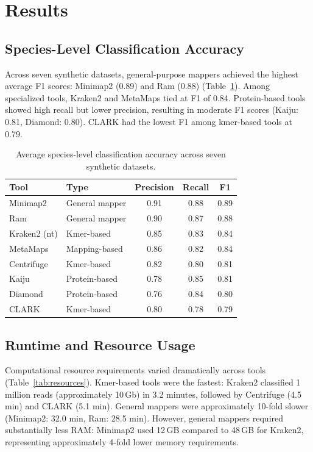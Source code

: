\documentclass[11pt]{article}
\begin{document}
\section{Results}

\subsection{Species-Level Classification Accuracy}

Across seven synthetic datasets, general-purpose mappers achieved the highest average F1 scores: Minimap2 (0.89) and Ram (0.88) (Table~\ref{tab:accuracy}). Among specialized tools, Kraken2 and MetaMaps tied at F1 of 0.84. Protein-based tools showed high recall but lower precision, resulting in moderate F1 scores (Kaiju: 0.81, Diamond: 0.80). CLARK had the lowest F1 among kmer-based tools at 0.79.

\begin{table}[ht]
\centering
\caption{Average species-level classification accuracy across seven synthetic datasets.}
\label{tab:accuracy}
\begin{tabular}{@{}llccc@{}}
\toprule
Tool & Type & Precision & Recall & F1 \\
\midrule
Minimap2 & General mapper & 0.91 & 0.88 & 0.89 \\
Ram & General mapper & 0.90 & 0.87 & 0.88 \\
Kraken2 (nt) & Kmer-based & 0.85 & 0.83 & 0.84 \\
MetaMaps & Mapping-based & 0.86 & 0.82 & 0.84 \\
Centrifuge & Kmer-based & 0.82 & 0.80 & 0.81 \\
Kaiju & Protein-based & 0.78 & 0.85 & 0.81 \\
Diamond & Protein-based & 0.76 & 0.84 & 0.80 \\
CLARK & Kmer-based & 0.80 & 0.78 & 0.79 \\
\bottomrule
\end{tabular}
\end{table}

\subsection{Runtime and Resource Usage}

Computational resource requirements varied dramatically across tools (Table~\ref{tab:resources}). Kmer-based tools were the fastest: Kraken2 classified 1 million reads (approximately 10\,Gb) in 3.2 minutes, followed by Centrifuge (4.5 min) and CLARK (5.1 min). General mappers were approximately 10-fold slower (Minimap2: 32.0 min, Ram: 28.5 min). However, general mappers required substantially less RAM: Minimap2 used 12\,GB compared to 48\,GB for Kraken2, representing approximately 4-fold lower memory requirements.
\end{document}
